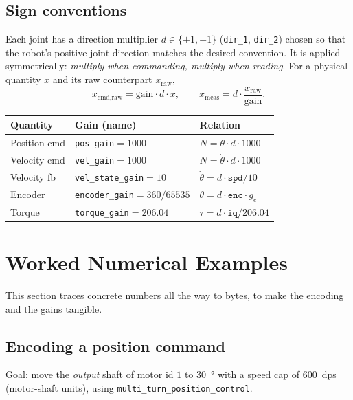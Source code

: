 \documentclass[11pt,a4paper]{article}
\newcommand{\code}[1]{\texttt{#1}}
\begin{document}
\subsection{Sign conventions}
\label{sec:signs}
Each joint has a direction multiplier $d\in\{+1,-1\}$ (\code{dir\_1},
\code{dir\_2}) chosen so that the robot's positive joint direction matches the
desired convention. It is applied symmetrically: \emph{multiply when commanding,
multiply when reading}. For a physical quantity $x$ and its raw counterpart
$x_{\text{raw}}$,
\begin{equation}
  x_{\text{cmd,raw}} = \text{gain}\cdot d\cdot x, \qquad
  x_{\text{meas}} = d\cdot \frac{x_{\text{raw}}}{\text{gain}} .
\end{equation}

\begin{center}
\begin{tabular}{@{}lll@{}}
\toprule
\textbf{Quantity} & \textbf{Gain (name)} & \textbf{Relation} \\
\midrule
Position cmd     & \code{pos\_gain}$=1000$        & $N=\theta\cdot d\cdot 1000$ \\
Velocity cmd     & \code{vel\_gain}$=1000$        & $N=\dot\theta\cdot d\cdot 1000$ \\
Velocity fb      & \code{vel\_state\_gain}$=10$   & $\dot\theta = d\cdot\texttt{spd}/10$ \\
Encoder          & \code{encoder\_gain}$=360/65535$& $\theta=d\cdot\texttt{enc}\cdot g_e$ \\
Torque           & \code{torque\_gain}$=206.04$   & $\tau = d\cdot\texttt{iq}/206.04$ \\
\bottomrule
\end{tabular}
\end{center}

\section{Worked Numerical Examples}

This section traces concrete numbers all the way to bytes, to make the encoding
and the gains tangible.

\subsection{Encoding a position command}
Goal: move the \emph{output} shaft of motor id $1$ to \SI{30}{\degree} with a
speed cap of \SI{600}{dps} (motor-shaft units), using
\code{multi\_turn\_position\_control}.
\end{document}
